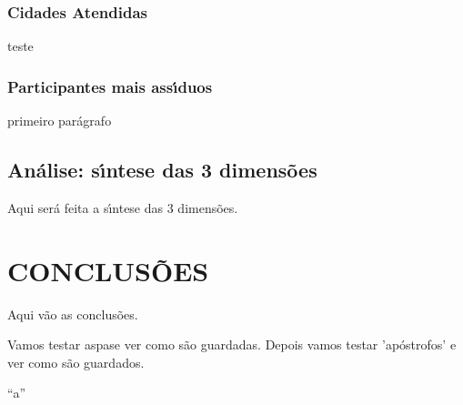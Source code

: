 \documentclass[
12pt,		%
openright,	%
twoside,  %
a4paper,			%
chapter=TITLE,		%
english,			%
french,				%
spanish,			%
brazil				%
]{USPSC-classe/USPSC_RedarTex}
\begin{document}
\subsection[Cidades Atendidas]{Cidades Atendidas}\label{Cidades Atendidas}
teste










\subsection[Participantes mais ass\'{\i}duos]{Participantes mais ass\'{\i}duos}\label{Participantes mais ass\'{\i}duos}
primeiro par\'agrafo










\section[An\'alise: s\'{\i}ntese das 3 dimens\~oes]{An\'alise: s\'{\i}ntese das 3 dimens\~oes}\label{An\'alise: s\'{\i}ntese das 3 dimens\~oes}
Aqui ser\'a feita a s\'{\i}ntese das 3 dimens\~oes.










\chapter[CONCLUS\~OES]{CONCLUS\~OES}\label{CONCLUS\~OES}
Aqui v\~ao as conclus\~oes.










Vamos testar \textquotedbl aspas\textquotedbl  e ver como s\~ao guardadas. Depois vamos testar 'ap\'ostrofos' e ver como s\~ao guardados.










``a''
\end{document}
